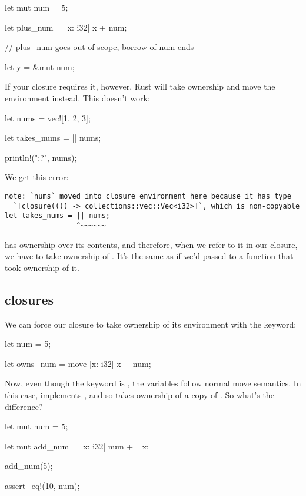 \begin{rustc}
let mut num = 5;
{
    let plus_num = |x: i32| x + num;

} // plus_num goes out of scope, borrow of num ends

let y = &mut num;
\end{rustc}

If your closure requires it, however, Rust will take ownership and move the environment instead. This doesn't work:

\begin{rustc}
let nums = vec![1, 2, 3];

let takes_nums = || nums;

println!("{:?}", nums);
\end{rustc}

We get this error:

\begin{verbatim}
note: `nums` moved into closure environment here because it has type
  `[closure(()) -> collections::vec::Vec<i32>]`, which is non-copyable
let takes_nums = || nums;
                 ^~~~~~~
\end{verbatim}

 has ownership over its contents, and therefore, when we refer to it in our closure, we have to take ownership of . 
It's the same as if we'd passed  to a function that took ownership of it.

\subsection*{ closures}

We can force our closure to take ownership of its environment with the  keyword:

\begin{rustc}
let num = 5;

let owns_num = move |x: i32| x + num;
\end{rustc}

Now, even though the keyword is , the variables follow normal move semantics. In this case,  implements , 
and so  takes ownership of a copy of . So what's the difference?

\begin{rustc}
let mut num = 5;

{
    let mut add_num = |x: i32| num += x;

    add_num(5);
}

assert_eq!(10, num);
\end{rustc}

